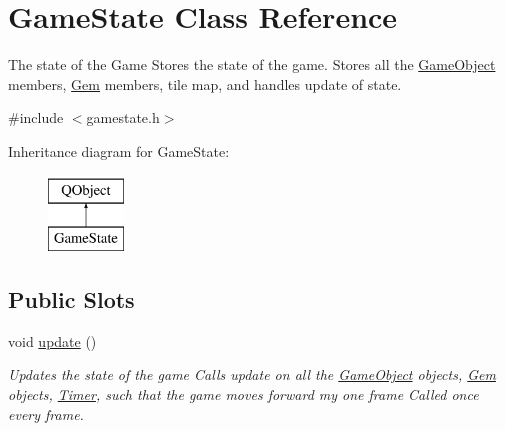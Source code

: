 \hypertarget{classGameState}{\section{Game\-State Class Reference}
\label{classGameState}
}


The state of the Game Stores the state of the game. Stores all the \hyperlink{classGameObject}{Game\-Object} members, \hyperlink{classGem}{Gem} members, tile map, and handles update of state.  




{\ttfamily \#include $<$gamestate.\-h$>$}

Inheritance diagram for Game\-State\-:\begin{figure}[H]
\begin{center}
\leavevmode
\includegraphics[height=2.000000cm]{classGameState}
\end{center}
\end{figure}
\subsection*{Public Slots}
\begin{DoxyCompactItemize}
\item 
\hypertarget{classGameState_aaecebaa5f6cd88e093927fc3cb321c10}{void \hyperlink{classGameState_aaecebaa5f6cd88e093927fc3cb321c10}{update} ()}\label{classGameState_aaecebaa5f6cd88e093927fc3cb321c10}

\begin{DoxyCompactList}\small\item\em Updates the state of the game Calls update on all the \hyperlink{classGameObject}{Game\-Object} objects, \hyperlink{classGem}{Gem} objects, \hyperlink{classTimer}{Timer}, such that the game moves forward my one frame Called once every frame. \end{DoxyCompactList}\end{DoxyCompactItemize}
